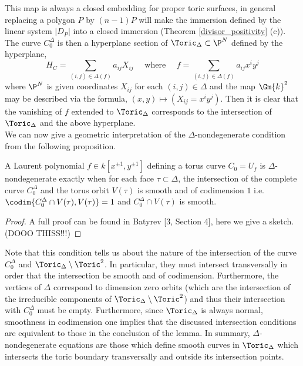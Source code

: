 \documentclass[12pt]{article}
\begin{document}
This map is always a closed embedding for proper toric surfaces, in general replacing a polygon $P$ by $(n-1)P$ will make the immersion defined by the linear system $|D_P|$ into a closed immersion (Theorem \ref{divisor_positivity} (c)). The curve $C^\Delta_0$ is then a hyperplane section of $\Toric_\Delta \subset \P^N$ defined by the hyperplane,
\[ H_C = \sum_{(i, j) \in \Delta(f)} a_{ij} X_{ij} \quad \text{ where } \quad f = \sum_{(i,j) \in \Delta(f)} a_{ij} x^i y^j \]
where $\P^N$ is given coordinates $X_{ij}$ for each $(i,j) \in \Delta$ and the map $\Gm{k}^2$ may be described via the formula, $(x,y) \mapsto (X_{ij} = x^i y^j)$. Then it is clear that the vanishing of $f$ extended to $\Toric_\Delta$ corresponds to the intersection of $\Toric_\Delta$ and the above hyperplane.  
\bigskip\\
We can now give a geometric interpretation of the $\Delta$-nondegenerate condition from the following proposition.

\begin{prop}
A Laurent polynomial $f \in k[x^{\pm 1}, y^{\pm 1}]$ defining a torus curve $C_0 = U_f$ is $\Delta$-nondegenerate exactly when for each face $\tau \subset \Delta$, the intersection of the complete curve $C^\Delta_0$ and the torus orbit $V(\tau)$ is smooth and of codimension $1$ i.e. $\codim{C^\Delta_0 \cap V(\tau), V(\tau)} = 1$ and $C^\Delta_0 \cap V(\tau)$ is smooth.
\end{prop}

\begin{proof}
A full proof can be found in Batyrev [3, Section 4], here we give a sketch.  (DOOO THISS!!!)
\end{proof}
\noindent
Note that this condition tells us about the nature of the intersection of the curve $C^\Delta_0$ and $\Toric_\Delta \setminus \Toric^2$. In particular, they must intersect transversally in order that the intersection be smooth and of codimension. Furthermore, the vertices of $\Delta$ correspond to dimension zero orbits (which are the intersection of the irreducible components of $\Toric_\Delta \setminus \Toric^2$) and thus their intersection with $C^\Delta_0$ must be empty. Furthermore, since $\Toric_\Delta$ is always normal, smoothness in codimension one implies that the discussed intersection conditions are equivalent to those in the conclusion of the lemma. In summary, $\Delta$-nondegenerate equations are those which define smooth curves in $\Toric_\Delta$ which intersects the toric boundary transversally and outside its intersection points.
\end{document}
